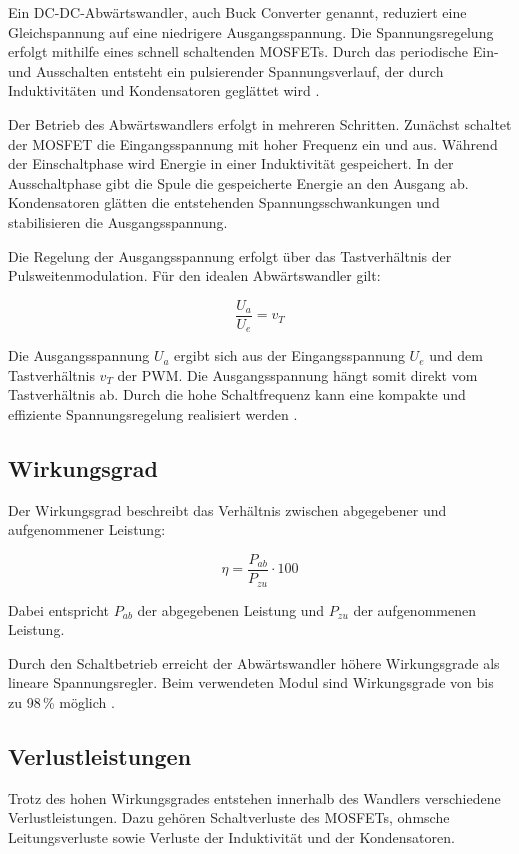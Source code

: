 Ein DC-DC-Abwärtswandler, auch Buck Converter genannt, reduziert eine Gleichspannung auf eine niedrigere Ausgangsspannung. 
Die Spannungsregelung erfolgt mithilfe eines schnell schaltenden MOSFETs. 
Durch das periodische Ein- und Ausschalten entsteht ein pulsierender Spannungsverlauf, der durch Induktivitäten und Kondensatoren geglättet wird \cite{Schlienz:2020}.

Der Betrieb des Abwärtswandlers erfolgt in mehreren Schritten. 
Zunächst schaltet der MOSFET die Eingangsspannung mit hoher Frequenz ein und aus. 
Während der Einschaltphase wird Energie in einer Induktivität gespeichert. 
In der Ausschaltphase gibt die Spule die gespeicherte Energie an den Ausgang ab. 
Kondensatoren glätten die entstehenden Spannungsschwankungen und stabilisieren die Ausgangsspannung.

Die Regelung der Ausgangsspannung erfolgt über das Tastverhältnis der Pulsweitenmodulation. 
Für den idealen Abwärtswandler gilt:

\[
\frac{U_a}{U_e} = v_T
\]

Die Ausgangsspannung \(U_a\) ergibt sich aus der Eingangsspannung \(U_e\) und dem Tastverhältnis \(v_T\) der PWM. 
Die Ausgangsspannung hängt somit direkt vom Tastverhältnis ab. 
Durch die hohe Schaltfrequenz kann eine kompakte und effiziente Spannungsregelung realisiert werden \cite{Schlienz:2020}.

\subsection{Wirkungsgrad}

Der Wirkungsgrad beschreibt das Verhältnis zwischen abgegebener und aufgenommener Leistung:

\[
\eta = \frac{P_{ab}}{P_{zu}} \cdot 100
\]

Dabei entspricht \(P_{ab}\) der abgegebenen Leistung und \(P_{zu}\) der aufgenommenen Leistung.

Durch den Schaltbetrieb erreicht der Abwärtswandler höhere Wirkungsgrade als lineare Spannungsregler. 
Beim verwendeten Modul sind Wirkungsgrade von bis zu 98\,\% möglich \cite{MP2307:Datasheet}.

\subsection{Verlustleistungen}

Trotz des hohen Wirkungsgrades entstehen innerhalb des Wandlers verschiedene Verlustleistungen. 
Dazu gehören Schaltverluste des MOSFETs, ohmsche Leitungsverluste sowie Verluste der Induktivität und der Kondensatoren.


